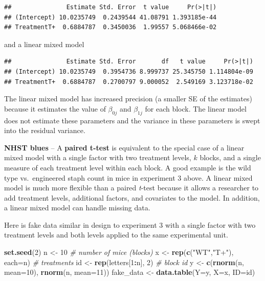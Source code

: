 \documentclass[]{book}
\newenvironment{Shaded}{\begin{snugshade}}{\end{snugshade}}
\newcommand{\KeywordTok}[1]{\textcolor[rgb]{0.13,0.29,0.53}{\textbf{#1}}}
\newcommand{\DataTypeTok}[1]{\textcolor[rgb]{0.13,0.29,0.53}{#1}}
\newcommand{\DecValTok}[1]{\textcolor[rgb]{0.00,0.00,0.81}{#1}}
\newcommand{\StringTok}[1]{\textcolor[rgb]{0.31,0.60,0.02}{#1}}
\newcommand{\CommentTok}[1]{\textcolor[rgb]{0.56,0.35,0.01}{\textit{#1}}}
\newcommand{\OperatorTok}[1]{\textcolor[rgb]{0.81,0.36,0.00}{\textbf{#1}}}
\newcommand{\NormalTok}[1]{#1}
\begin{document}
\begin{verbatim}
##               Estimate Std. Error  t value     Pr(>|t|)
## (Intercept) 10.0235749  0.2439544 41.08791 1.393185e-44
## TreatmentT+  0.6884787  0.3450036  1.99557 5.068466e-02
\end{verbatim}

and a linear mixed model

\begin{verbatim}
##               Estimate Std. Error       df   t value     Pr(>|t|)
## (Intercept) 10.0235749  0.3954736 8.999737 25.345750 1.114804e-09
## TreatmentT+  0.6884787  0.2700797 9.000052  2.549169 3.123718e-02
\end{verbatim}

The linear mixed model has increased precision (a smaller SE of the
estimates) because it estimates the value of \(\beta_{0j}\) and
\(\beta_{1j}\) for each block. The linear model does not estimate these
parameters and the variance in these parameters is swept into the
residual variance.

\textbf{NHST blues} -- A \textbf{paired t-test} is equivalent to the
special case of a linear mixed model with a single factor with two
treatment levels, \(k\) blocks, and a single measure of each treatment
level within each block. A good example is the wild type vs.~engineered
staph count in mice in experiment 3 above. A linear mixed model is much
more flexible than a paired \emph{t}-test because it allows a researcher
to add treatment levels, additional factors, and covariates to the
model. In addition, a linear mixed model can handle missing data.

Here is fake data similar in design to experiment 3 with a single factor
with two treatment levels and both levels applied to the same
experimental unit.

\begin{Shaded}
\begin{Highlighting}[]
\KeywordTok{set.seed}\NormalTok{(}\DecValTok{2}\NormalTok{)}
\NormalTok{n <-}\StringTok{ }\DecValTok{10} \CommentTok{# number of mice (blocks)}
\NormalTok{x <-}\StringTok{ }\KeywordTok{rep}\NormalTok{(}\KeywordTok{c}\NormalTok{(}\StringTok{"WT"}\NormalTok{,}\StringTok{"T+"}\NormalTok{), }\DataTypeTok{each=}\NormalTok{n) }\CommentTok{# treatments}
\NormalTok{id <-}\StringTok{ }\KeywordTok{rep}\NormalTok{(letters[}\DecValTok{1}\OperatorTok{:}\NormalTok{n], }\DecValTok{2}\NormalTok{) }\CommentTok{# block id}
\NormalTok{y <-}\StringTok{ }\KeywordTok{c}\NormalTok{(}\KeywordTok{rnorm}\NormalTok{(n, }\DataTypeTok{mean=}\DecValTok{10}\NormalTok{), }\KeywordTok{rnorm}\NormalTok{(n, }\DataTypeTok{mean=}\DecValTok{11}\NormalTok{))}
\NormalTok{fake_data <-}\StringTok{ }\KeywordTok{data.table}\NormalTok{(}\DataTypeTok{Y=}\NormalTok{y, }\DataTypeTok{X=}\NormalTok{x, }\DataTypeTok{ID=}\NormalTok{id)}
\end{Highlighting}
\end{Shaded}
\end{document}
